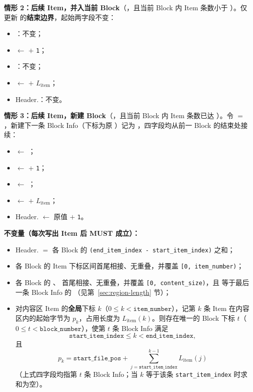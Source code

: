 \textbf{情形 2：后续 Item，并入当前 Block}（，且当前 Block 内 Item 条数小于 ）。仅更新  的\textbf{结束边界}，起始两字段不变：
\begin{itemize}
  \item {}：不变；
  \item {} $\leftarrow$  $+$ \texttt{1}；
  \item {}：不变；
  \item {} $\leftarrow$  $+$ $L_{\mathrm{item}}$；
  \item Header.：不变。
\end{itemize}

\textbf{情形 3：后续 Item，新建 Block}（，且当前 Block 内 Item 条数已达 ）。令  $=$ ，新建下一条 Block Info（下标为原 ）记为 ，四字段均从前一 Block 的结束处接续：
\begin{itemize}
  \item {} $\leftarrow$ ；
  \item {} $\leftarrow$  $+$ \texttt{1}；
  \item {} $\leftarrow$ ；
  \item {} $\leftarrow$  $+$ $L_{\mathrm{item}}$；
  \item Header. $\leftarrow$ 原值 $+$ \texttt{1}。
\end{itemize}

\textbf{不变量（每次写出 Item 后 MUST 成立）：}
\begin{itemize}
  \item Header. $=$ 各 Block 的 \texttt{(end\_item\_index -
          start\_item\_index)} 之和；
  \item 各 Block 的 Item 下标区间首尾相接、无重叠，并覆盖 \texttt{[0, item\_number)}；
  \item 各 Block 的 、 首尾相接、无重叠，并覆盖 \texttt{[0, content\_size)}，且  等于最后一条 Block Info 的 （见第~\ref{sec:region-length} 节）；
  \item 对内容区 Item 的\textbf{全局}下标 $k$（$0 \le k < \texttt{item\_number}$），记第 $k$ 条 Item 在内容区内的起始字节为 $p_k$，占用长度为 $L_{\mathrm{item}}(k)$。则存在唯一的 Block 下标 $t$（$0 \le t < \texttt{block\_number}$），使第 $t$ 条 Block Info 满足
        \[
          \texttt{start\_item\_index} \le k < \texttt{end\_item\_index},
        \]
        且
        \[
          p_k = \texttt{start\_file\_pos}
          + \sum_{j=\texttt{start\_item\_index}}^{k-1} L_{\mathrm{item}}(j)
        \]
        （上式四字段均指第 $t$ 条 Block Info；当 $k$ 等于该条 \texttt{start\_item\_index} 时求和为空）。
\end{itemize}

